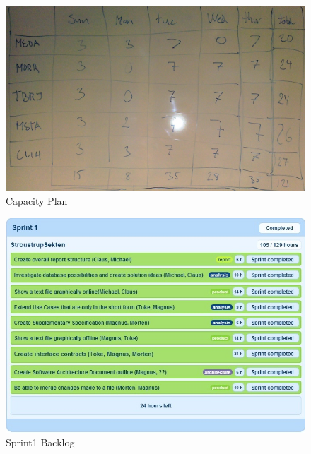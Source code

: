 \begin{figure}[H]
  \includegraphics[width=\textwidth,natwidth=2157,natheight=1336]{illustrations/CapacityPlan.jpg}
  \caption{Capacity Plan}
  \label{capacityplan}
\end{figure}
\begin{figure}[H]
  \includegraphics[width=\textwidth,natwidth=678,natheight=486]{illustrations/sprintbacklog1.jpeg}
  \caption{Sprint1 Backlog}
  \label{sprint1backlog}
\end{figure}
